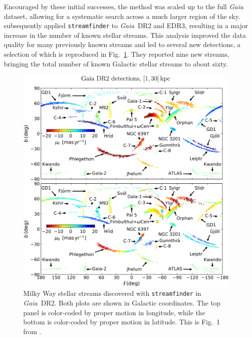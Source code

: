     Encouraged by these initial successes, the method was scaled up to the full \emph{Gaia} dataset, allowing for a systematic search across a much larger region of the sky. \citet{2021ApJ...914..123I} subsequently applied \texttt{streamfinder} to \emph{Gaia}~DR2 and EDR3, resulting in a major increase in the number of known stellar streams. This analysis improved the data quality for many previously known streams and led to several new detections, a selection of which is reproduced in Fig.~\ref{fig:ibata_2021_fig1}. They reported nine new streams, bringing the total number of known Galactic stellar streams to about sixty. 
    \begin{figure}
        \centering
        \includegraphics[width=\linewidth]{images/ibata_2021_fig1.jpg}
        \caption[Milky Way stellar streams discovered with \texttt{streamfinder} in \emph{Gaia} DR2]{Milky Way stellar streams discovered with \texttt{streamfinder} in \emph{Gaia}~DR2. Both plots are shown in Galactic coordinates. The top panel is color-coded by proper motion in longitude, while the bottom is color-coded by proper motion in latitude. This is Fig.~1 from \citet{2021ApJ...914..123I}.}
        \label{fig:ibata_2021_fig1}
    \end{figure}
